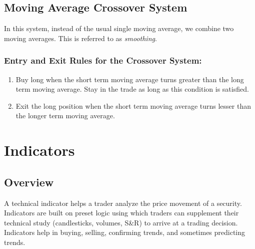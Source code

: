 

\subsection{Moving Average Crossover System}
In this system, instead of the usual single moving average, we combine two moving averages. This is referred to as \emph{smoothing}.


\subsubsection{Entry and Exit Rules for the Crossover System:}
\begin{enumerate}
  \item Buy long when the short term moving average turns greater than the long term moving average. Stay in the trade as long as this condition is satisfied.
  \item Exit the long position when the short term moving average turns lesser than the longer term moving average.
\end{enumerate}

\newpage

\section{Indicators}

\subsection{Overview}

A technical indicator helps a trader analyze the price movement of a security.  Indicators are built on preset logic using which traders can supplement their technical study (candlesticks, volumes, S\&R) to arrive at a trading decision. Indicators help in buying, selling, confirming trends, and sometimes predicting trends.

